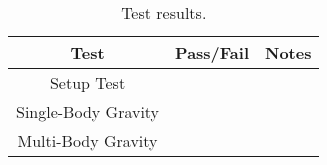 \begin{table}[htbp]
	\caption{Test results.}
	\label{tab:results}
	\centering \fontsize{10}{10}\selectfont
	\begin{tabular}{c | c | c  } %
		\hline
		\textbf{Test} 				    & \textbf{Pass/Fail} 						   			           & \textbf{Notes} 									\\ \hline
		Setup Test 		   			  	&      & 			 \\ \hline
		Single-Body Gravity		   	&                  &  \\ \hline
		Multi-Body Gravity			 &  			 	 &   			   \\ \hline
	\end{tabular}
\end{table}